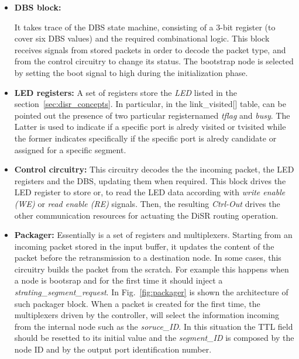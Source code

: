 \begin{itemize}

	\item \textbf{DBS block:}

	It takes trace of the DBS state machine,  consisting of a 3-bit
	register (to cover six DBS values) and the  required combinational
	logic. This block receives signals from  stored packets  in order
	to decode the packet type, and from  the control circuitry to
	change its status. The bootstrap node is selected by setting the
	boot signal to high during the initialization phase.

	\item \textbf{LED registers:}
	A set of registers store the \emph{LED} listed in the
	section~\ref{sec:disr_concepts}.  In particular, in the
	link\_visited[] table, can be pointed out the presence of two
	particular registernamed \emph{tflag} and \emph{busy}.  The Latter
	is used to indicate if a specific port is alredy visited or
	tvisited while the former indicates specifically if the specific
	port is alredy candidate or  assigned for a specific segment.

    \item \textbf{Control circuitry:}
    This circuitry decodes the the      incoming packet, the LED
	registers and the DBS,     updating them when required. This block
	drives the LED register   to store or, to read the LED data
	according with \emph{write enable (WE)} or \emph{read enable (RE)}
	signals. Then, the resulting \emph{Ctrl-Out} drives the other
	communication resources for actuating the DiSR routing operation.

	\item \textbf{Packager:}
	Essentially is a set of registers and multiplexers. Starting from
	an incoming packet stored in the input buffer, it updates the
	content of the packet before the retransmission to   a destination
	node.  In some cases, this circuitry builds the packet from the
	scratch.  For example this happens when a node is bootsrap and for
	the first time it should inject a \emph{strating\_segment\_request}. 
	In Fig.~\ref{fig:packager} is shown the architecture of such packager 
	block. When a packet is created for the first time, the multiplexers 
	driven by the controller, will select the information incoming from the 
	internal node such as the \emph{soruce\_ID}. In this situation the 
	TTL field should be resetted to its initial value and the \emph{segment\_ID}
	is composed by the node ID and by the output port identification 
	number.

\end{itemize}

